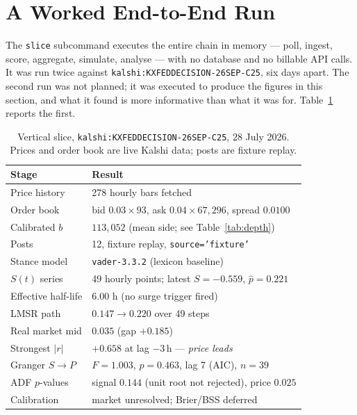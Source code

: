 \documentclass[11pt]{article}
\newcommand{\code}[1]{\texttt{\small #1}}
\begin{document}
\section{A Worked End-to-End Run}
\label{sec:worked}

The \code{slice} subcommand executes the entire chain in memory --- poll, ingest,
score, aggregate, simulate, analyse --- with no database and no billable API
calls. It was run twice against \code{kalshi:KXFEDDECISION-26SEP-C25}, six days
apart. The second run was not planned; it was executed to produce the figures in
this section, and what it found is more informative than what it was for.
Table~\ref{tab:slice} reports the first.

\begin{table}[htbp]
\centering
\caption[Vertical slice results, 28 July 2026]{Vertical slice, \code{kalshi:KXFEDDECISION-26SEP-C25}, 28 July 2026.
Prices and order book are live Kalshi data; posts are fixture replay.}
\label{tab:slice}
\small
\begin{tabular}{@{}ll@{}}
\toprule
Stage & Result \\
\midrule
Price history        & 278 hourly bars fetched \\
Order book           & bid $0.03 \times 93$, ask $0.04 \times 67{,}296$, spread $0.0100$ \\
Calibrated $b$       & $113{,}052$ (mean side; see Table~\ref{tab:depth}) \\
Posts                & 12, fixture replay, \code{source='fixture'} \\
Stance model         & \code{vader-3.3.2} (lexicon baseline) \\
$S(t)$ series        & 49 hourly points; latest $S = -0.559$, $\hat{p} = 0.221$ \\
Effective half-life  & 6.00 h (no surge trigger fired) \\
LMSR path            & $0.147 \to 0.220$ over 49 steps \\
Real market mid      & $0.035$ \quad (gap $+0.185$) \\
Strongest $|r|$      & $+0.658$ at lag $-3$\,h --- \emph{price leads} \\
Granger $S \to P$    & $F = 1.003$, $p = 0.463$, lag 7 (AIC), $n = 39$ \\
ADF $p$-values       & signal $0.144$ (unit root not rejected), price $0.025$ \\
Calibration          & market unresolved; Brier/BSS deferred \\
\bottomrule
\end{tabular}
\end{table}
\end{document}
